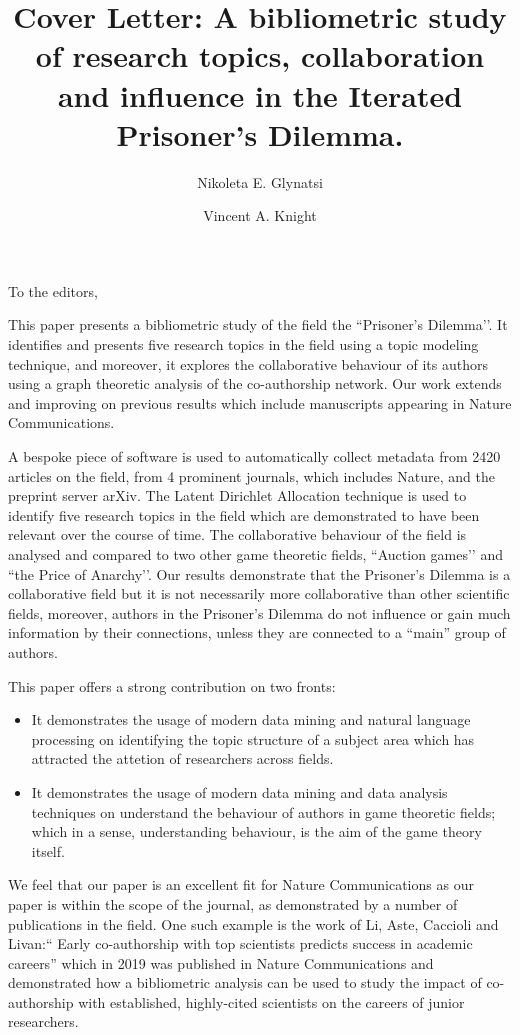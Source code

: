 \documentclass{article}
\title{Cover Letter: A bibliometric study of research topics, collaboration and
influence in the Iterated Prisoner’s Dilemma.}
\author[1]{Nikoleta E. Glynatsi}
\author[1]{Vincent A. Knight}
\affil[1]{Cardiff University, School of Mathematics, Cardiff, United Kingdom}
\date{}
\begin{document}
\maketitle

To the editors,

This paper presents a bibliometric study of the field the ``Prisoner’s
Dilemma’’. It identifies and presents five research topics in the field using a
topic modeling technique, and moreover, it explores the collaborative behaviour
of its authors using a graph theoretic analysis of the co-authorship network.
Our work extends and improving on previous results which include
manuscripts appearing in Nature Communications.

A bespoke piece of software is used to automatically collect metadata from 2420
articles on the field, from 4 prominent journals, which includes Nature, and the
preprint server arXiv. The Latent Dirichlet Allocation technique is used to
identify five research topics in the field which are demonstrated to have been
relevant over the course of time. The collaborative behaviour of the field is
analysed and compared to two other game theoretic fields, ``Auction games’’ and
``the Price of Anarchy’’. Our results demonstrate that the Prisoner's Dilemma is
a collaborative field but it is not necessarily more collaborative than other
scientific fields, moreover, authors in the Prisoner’s Dilemma do not influence
or gain much information by their connections, unless they are connected to a
``main” group of authors.

This paper offers a strong contribution on two fronts:

\begin{itemize}
    \item It demonstrates the usage of modern data mining and natural language
    processing on identifying the topic structure of a subject area which has
    attracted the attetion of researchers across fields.
    \item It demonstrates the usage of modern data mining and data analysis
    techniques on understand the behaviour of authors in game theoretic
    fields; which in a sense, understanding behaviour, is the aim of the game
    theory itself.
\end{itemize}

We feel that our paper is an excellent fit for Nature Communications as our
paper is within the scope of the journal, as demonstrated by a number of
publications in the field. One such example is the work of Li, Aste, Caccioli
and Livan:`` Early co-authorship with top scientists predicts success
in academic careers'' which in 2019 was published in Nature Communications and
demonstrated how a bibliometric analysis can be used to study the impact of
co-authorship with established, highly-cited scientists on the careers of junior
researchers.
\end{document}
